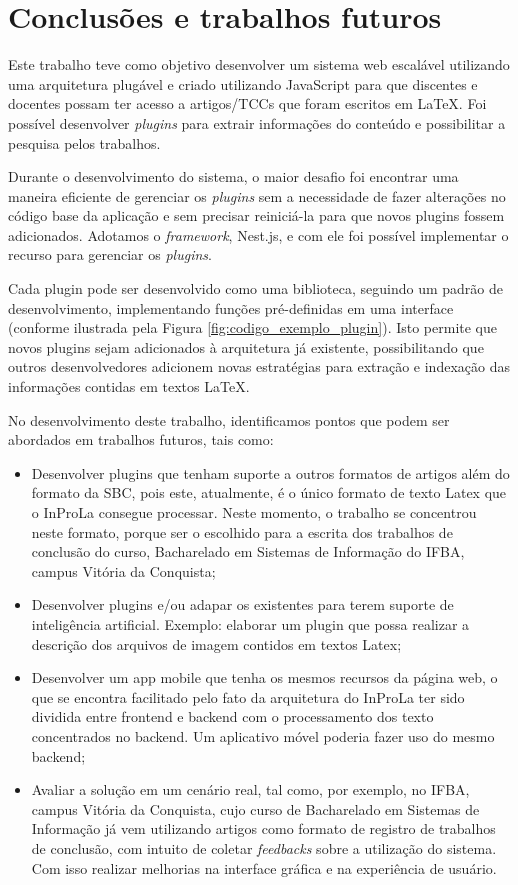 \documentclass[12pt]{article}
\begin{document}
\section{Conclusões e trabalhos futuros}

Este trabalho teve como objetivo desenvolver um sistema web escalável utilizando uma arquitetura plugável e criado utilizando JavaScript para que discentes e docentes possam ter acesso a artigos/TCCs que foram escritos em LaTeX. Foi possível desenvolver \textit{plugins} para extrair informações do conteúdo e possibilitar a pesquisa pelos trabalhos.

Durante o desenvolvimento do sistema, o maior desafio foi encontrar uma maneira eficiente de gerenciar os \textit{plugins} sem a necessidade de fazer alterações no código base da aplicação e sem precisar reiniciá-la para que novos plugins fossem adicionados. Adotamos o \textit{framework}, Nest.js, e com ele foi possível implementar o recurso para gerenciar os \textit{plugins}.

Cada plugin pode ser desenvolvido como uma biblioteca, seguindo um padrão de desenvolvimento, implementando funções pré-definidas em uma interface (conforme ilustrada pela Figura \ref{fig:codigo_exemplo_plugin}). Isto permite que novos plugins sejam adicionados à arquitetura já existente, possibilitando que outros desenvolvedores adicionem novas estratégias para extração e indexação das informações contidas em textos LaTeX.

No desenvolvimento deste trabalho, identificamos pontos que podem ser abordados em trabalhos futuros, tais como:
\begin{itemize}
    \item Desenvolver plugins que tenham suporte a outros formatos de artigos além do formato da SBC, pois este, atualmente, é o único formato de texto Latex que o InProLa consegue processar. Neste momento, o trabalho se concentrou neste formato, porque ser o escolhido para a escrita dos trabalhos de conclusão do curso, Bacharelado em Sistemas de Informação do IFBA, campus Vitória da Conquista;
    \item Desenvolver plugins e/ou adapar os existentes para terem suporte de inteligência artificial. Exemplo: elaborar um plugin que possa realizar a descrição dos arquivos de imagem contidos em textos Latex;
    \item Desenvolver um app mobile que tenha os mesmos recursos da página web, o que se encontra facilitado pelo fato da arquitetura do InProLa ter sido dividida entre frontend e backend com o processamento dos texto concentrados no backend. Um aplicativo móvel poderia fazer uso do mesmo backend;
    \item Avaliar a solução em um cenário real, tal como, por exemplo, no IFBA, campus Vitória da Conquista, cujo curso de Bacharelado em Sistemas de Informação já vem utilizando artigos como formato de registro de trabalhos de conclusão, com intuito de coletar \textit{feedbacks} sobre a utilização do sistema. Com isso realizar melhorias na interface gráfica e na experiência de usuário.
\end{itemize}
\end{document}

